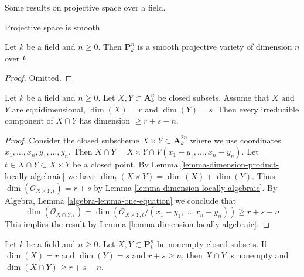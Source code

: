 \noindent
Some results on projective space over a field.

\begin{lemma}
\label{lemma-projective-space-smooth}
\begin{slogan}
Projective space is smooth.
\end{slogan}
Let $k$ be a field and $n \geq 0$. Then $\mathbf{P}^n_k$ is a
smooth projective variety of dimension $n$ over $k$.
\end{lemma}

\begin{proof}
Omitted.
\end{proof}

\begin{lemma}
\label{lemma-intersection-in-affine-space}
Let $k$ be a field and $n \geq 0$. Let $X, Y \subset \mathbf{A}^n_k$
be closed subsets. Assume that $X$ and $Y$ are equidimensional,
$\dim(X) = r$ and $\dim(Y) = s$.
Then every irreducible component of $X \cap Y$ has dimension $\geq r + s - n$.
\end{lemma}

\begin{proof}
Consider the closed subscheme $X \times Y \subset \mathbf{A}^{2n}_k$
where we use coordinates $x_1, \ldots, x_n, y_1, \ldots, y_n$. Then
$X \cap Y = X \times Y \cap V(x_1 - y_1, \ldots, x_n - y_n)$.
Let $t \in X \cap Y \subset X \times Y$ be a closed point.
By Lemma \ref{lemma-dimension-product-locally-algebraic}
we have $\dim_t(X \times Y) = \dim(X) + \dim(Y)$.
Thus $\dim(\mathcal{O}_{X \times Y, t}) = r + s$ by
Lemma \ref{lemma-dimension-locally-algebraic}.
By Algebra, Lemma \ref{algebra-lemma-one-equation}
we conclude that
$$
\dim(\mathcal{O}_{X \cap Y, t}) =
\dim(\mathcal{O}_{X \times Y, t}/(x_1 - y_1, \ldots, x_n - y_n)) \geq
r + s - n
$$
This implies the result by Lemma \ref{lemma-dimension-locally-algebraic}.
\end{proof}

\begin{lemma}
\label{lemma-intersection-in-projective-space}
Let $k$ be a field and $n \geq 0$. Let $X, Y \subset \mathbf{P}^n_k$
be nonempty closed subsets. If $\dim(X) = r$ and $\dim(Y) = s$ and
$r + s \geq n$, then $X \cap Y$ is nonempty and
$\dim(X \cap Y) \geq r + s - n$.
\end{lemma}

